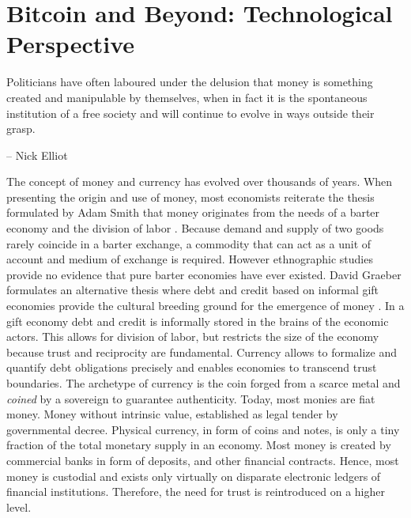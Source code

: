 \chapter{Bitcoin and Beyond: Technological Perspective}
\label{sec:crypto}

\epigraph{Politicians have often laboured under the delusion that money is something created and manipulable by themselves, when in fact it is the spontaneous institution of a free society and will continue to evolve in ways outside their grasp.}{-- \textup{Nick Elliot}}

The concept of money and currency has evolved over thousands of years. When presenting the origin and use of money, most economists reiterate the thesis formulated by Adam Smith that money originates from the needs of a barter economy and the division of labor \parencite{CITATION}. Because demand and supply of two goods rarely coincide in a barter exchange, a commodity that can act as a unit of account and medium of exchange is required. However ethnographic studies provide no evidence that pure barter economies have ever existed. David Graeber formulates an alternative thesis where debt and credit based on informal gift economies provide the cultural breeding ground for the emergence of money \parencite{graeber2014debt}. 
In a gift economy debt and credit is informally stored in the brains of the economic actors. This allows for division of labor, but restricts the size of the economy because trust and reciprocity are fundamental. Currency allows to formalize and quantify debt obligations precisely and enables economies to transcend trust boundaries. The archetype of currency is the coin forged from a scarce metal and \emph{coined} by a sovereign to guarantee authenticity. Today, most monies are fiat money. Money without intrinsic value, established as legal tender by governmental decree. Physical currency, in form of coins and notes, is only a tiny fraction of the total monetary supply in an economy. Most money is created by commercial banks in form of deposits, and other financial contracts. Hence, most money is custodial and exists only virtually on disparate electronic ledgers of financial institutions. Therefore, the need for trust is reintroduced on a higher level.

